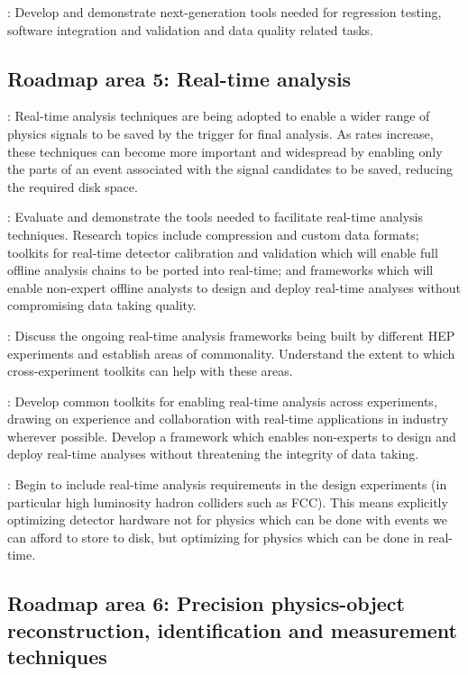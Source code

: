 \vskip 0.5cm
: Develop and demonstrate next-generation tools needed for regression testing, software integration and validation and data quality related tasks. 

\subsection{Roadmap area 5: Real-time analysis}

: Real-time analysis techniques are being adopted to enable a wider range of physics signals to be saved by the trigger for final analysis. As rates increase, these techniques can become more important and widespread by enabling only the parts of an event associated with the signal candidates to be saved, reducing the required disk space.

\vskip 0.5cm
 : Evaluate and demonstrate the tools needed to facilitate real-time analysis techniques. Research topics include compression and custom data formats; toolkits for real-time detector calibration and validation which will enable full offline analysis chains to be ported into real-time; and frameworks which will enable non-expert offline analysts to design and deploy real-time analyses without compromising data taking quality. 

\vskip 0.5cm
: Discuss the ongoing real-time analysis frameworks being built by different HEP experiments and establish areas of commonality. Understand the extent to which cross-experiment toolkits can help with these areas. 

\vskip 0.5cm
: Develop common toolkits for enabling real-time analysis across experiments, drawing on experience and collaboration with real-time applications in industry wherever possible. Develop a framework which enables non-experts to design and deploy real-time analyses without threatening the integrity of data taking.

\vskip 0.5cm
: Begin to include real-time analysis requirements in the design experiments (in particular high luminosity hadron colliders such as FCC). This means explicitly optimizing detector hardware not for physics which can be done with events we can afford to store to disk, but optimizing for physics which can be done in real-time.

\subsection{Roadmap area 6: Precision physics-object reconstruction, identification and measurement techniques}

